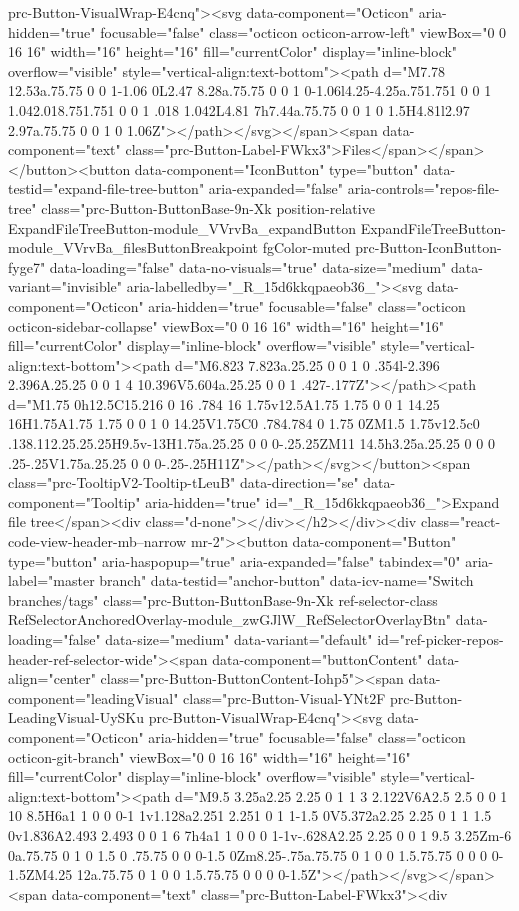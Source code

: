 prc-Button-VisualWrap-E4cnq"><svg data-component="Octicon" aria-hidden="true" focusable="false" class="octicon octicon-arrow-left" viewBox="0 0 16 16" width="16" height="16" fill="currentColor" display="inline-block" overflow="visible" style="vertical-align:text-bottom"><path d="M7.78 12.53a.75.75 0 0 1-1.06 0L2.47 8.28a.75.75 0 0 1 0-1.06l4.25-4.25a.751.751 0 0 1 1.042.018.751.751 0 0 1 .018 1.042L4.81 7h7.44a.75.75 0 0 1 0 1.5H4.81l2.97 2.97a.75.75 0 0 1 0 1.06Z"></path></svg></span><span data-component="text" class="prc-Button-Label-FWkx3">Files</span></span></button><button data-component="IconButton" type="button" data-testid="expand-file-tree-button" aria-expanded="false" aria-controls="repos-file-tree" class="prc-Button-ButtonBase-9n-Xk position-relative ExpandFileTreeButton-module_VVrvBa_expandButton ExpandFileTreeButton-module_VVrvBa_filesButtonBreakpoint fgColor-muted prc-Button-IconButton-fyge7" data-loading="false" data-no-visuals="true" data-size="medium" data-variant="invisible" aria-labelledby="_R_15d6kkqpaeob36_"><svg data-component="Octicon" aria-hidden="true" focusable="false" class="octicon octicon-sidebar-collapse" viewBox="0 0 16 16" width="16" height="16" fill="currentColor" display="inline-block" overflow="visible" style="vertical-align:text-bottom"><path d="M6.823 7.823a.25.25 0 0 1 0 .354l-2.396 2.396A.25.25 0 0 1 4 10.396V5.604a.25.25 0 0 1 .427-.177Z"></path><path d="M1.75 0h12.5C15.216 0 16 .784 16 1.75v12.5A1.75 1.75 0 0 1 14.25 16H1.75A1.75 1.75 0 0 1 0 14.25V1.75C0 .784.784 0 1.75 0ZM1.5 1.75v12.5c0 .138.112.25.25.25H9.5v-13H1.75a.25.25 0 0 0-.25.25ZM11 14.5h3.25a.25.25 0 0 0 .25-.25V1.75a.25.25 0 0 0-.25-.25H11Z"></path></svg></button><span class="prc-TooltipV2-Tooltip-tLeuB" data-direction="se" data-component="Tooltip" aria-hidden="true" id="_R_15d6kkqpaeob36_">Expand file tree</span><div class="d-none"></div></h2></div><div class="react-code-view-header-mb--narrow mr-2"><button data-component="Button" type="button" aria-haspopup="true" aria-expanded="false" tabindex="0" aria-label="master branch" data-testid="anchor-button" data-icv-name="Switch branches/tags" class="prc-Button-ButtonBase-9n-Xk ref-selector-class RefSelectorAnchoredOverlay-module_zwGJlW_RefSelectorOverlayBtn" data-loading="false" data-size="medium" data-variant="default" id="ref-picker-repos-header-ref-selector-wide"><span data-component="buttonContent" data-align="center" class="prc-Button-ButtonContent-Iohp5"><span data-component="leadingVisual" class="prc-Button-Visual-YNt2F prc-Button-LeadingVisual-UySKu prc-Button-VisualWrap-E4cnq"><svg data-component="Octicon" aria-hidden="true" focusable="false" class="octicon octicon-git-branch" viewBox="0 0 16 16" width="16" height="16" fill="currentColor" display="inline-block" overflow="visible" style="vertical-align:text-bottom"><path d="M9.5 3.25a2.25 2.25 0 1 1 3 2.122V6A2.5 2.5 0 0 1 10 8.5H6a1 1 0 0 0-1 1v1.128a2.251 2.251 0 1 1-1.5 0V5.372a2.25 2.25 0 1 1 1.5 0v1.836A2.493 2.493 0 0 1 6 7h4a1 1 0 0 0 1-1v-.628A2.25 2.25 0 0 1 9.5 3.25Zm-6 0a.75.75 0 1 0 1.5 0 .75.75 0 0 0-1.5 0Zm8.25-.75a.75.75 0 1 0 0 1.5.75.75 0 0 0 0-1.5ZM4.25 12a.75.75 0 1 0 0 1.5.75.75 0 0 0 0-1.5Z"></path></svg></span><span data-component="text" class="prc-Button-Label-FWkx3"><div 